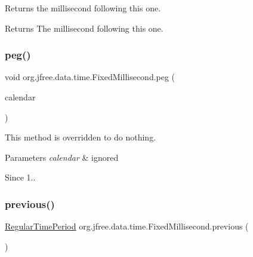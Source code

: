 Returns the millisecond following this one.

\begin{DoxyReturn}{Returns}
The millisecond following this one. 
\end{DoxyReturn}
\mbox{\label{classorg_1_1jfree_1_1data_1_1time_1_1_fixed_millisecond_a029f40d75617f862fdb9af8da5698fa3}} 
\subsubsection{\texorpdfstring{peg()}{peg()}}
{\footnotesize\ttfamily void org.\+jfree.\+data.\+time.\+Fixed\+Millisecond.\+peg (\begin{DoxyParamCaption}\item[{Calendar}]{calendar }\end{DoxyParamCaption})}

This method is overridden to do nothing.


\begin{DoxyParams}{Parameters}
{\em calendar} & ignored\\
\hline
\end{DoxyParams}
\begin{DoxySince}{Since}
1.. 
\end{DoxySince}
\mbox{\label{classorg_1_1jfree_1_1data_1_1time_1_1_fixed_millisecond_a39a4a14f44468b325929061c832a3844}} 
\subsubsection{\texorpdfstring{previous()}{previous()}}
{\footnotesize\ttfamily \mbox{\hyperlink{classorg_1_1jfree_1_1data_1_1time_1_1_regular_time_period}{Regular\+Time\+Period}} org.\+jfree.\+data.\+time.\+Fixed\+Millisecond.\+previous (\begin{DoxyParamCaption}{ }\end{DoxyParamCaption})}

